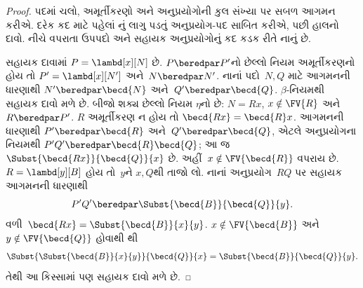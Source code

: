 \begin{proof}
  પદમાં ચલો, અમૂર્તીકરણો અને અનુપ્રયોગોની કુલ સંખ્યા પર
  સબળ આગમન કરીએ. દરેક કદ માટે પહેલાં
  નું લાગુ પડતું અનુપ્રયોગ-પદ સાબિત
  કરીએ, પછી હાલનો દાવો. નીચે વપરાતા ઉપપદો અને
  સહાયક અનુપ્રયોગોનું કદ કડક રીતે નાનું છે.

  સહાયક દાવામાં $P=\lambd[x][N]$ છે.
  $P\beredpar P'$નો છેલ્લો નિયમ અમૂર્તીકરણનો હોય તો
  $P'=\lambd[x][N']$ અને~$N\beredpar N'$.
  નાનાં પદો~$N,Q$ માટે આગમનની ધારણાથી
  $N'\beredpar\becd{N}$ અને~$Q'\beredpar\becd{Q}$.
  $\beta$-નિયમથી સહાયક દાવો મળે છે.
  બીજો શક્ય છેલ્લો નિયમ $\eta$નો છે:
  $N=Rx$, $x\notin\FV{R}$ અને~$R\beredpar P'$.
  $R$ અમૂર્તીકરણ ન હોય તો
  $\becd{Rx}=\becd{R}x$. આગમનની ધારણાથી
  $P'\beredpar\becd{R}$ અને~$Q'\beredpar\becd{Q}$,
  એટલે અનુપ્રયોગના નિયમથી
  $P'Q'\beredpar\becd{R}\becd{Q}$;
  આ જ~$\Subst{\becd{Rx}}{\becd{Q}}{x}$ છે.
  અહીં~$x\notin\FV{\becd{R}}$ વપરાય છે.
  $R=\lambd[y][B]$ હોય તો~$y$ને $x,Q$થી તાજો લો.
  નાનાં અનુપ્રયોગ~$RQ$ પર સહાયક આગમનની ધારણાથી
  \[
  P'Q'\beredpar\Subst{\becd{B}}{\becd{Q}}{y}.
  \]
  વળી~$\becd{Rx}=\Subst{\becd{B}}{x}{y}$.
  $x\notin\FV{\becd{B}}$ અને~$y\notin\FV{\becd{Q}}$
  હોવાથી થી
  \[
  \Subst{\Subst{\becd{B}}{x}{y}}{\becd{Q}}{x}
  =\Subst{\becd{B}}{\becd{Q}}{y}.
  \]
  તેથી આ કિસ્સામાં પણ સહાયક દાવો મળે છે.


\end{proof}

